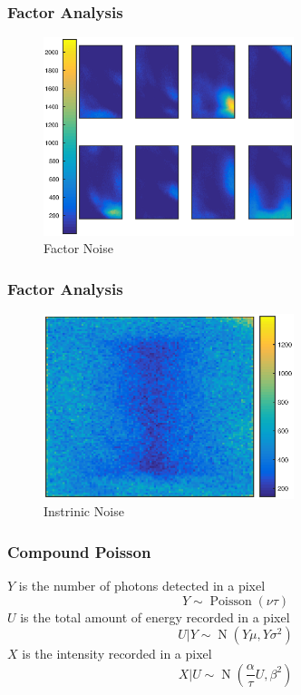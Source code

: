 \documentclass{beamer}
\DeclareMathOperator{\normal}{N}
\DeclareMathOperator{\poisson}{Poisson}
\begin{document}
\begin{frame}
\frametitle{Factor Analysis}
\begin{figure}
	\includegraphics[width = 0.65\textwidth]{figures/initial_factor_factorNoise.eps}
	\caption{Factor Noise}
\end{figure}
\end{frame}

\begin{frame}
\frametitle{Factor Analysis}
\begin{figure}
	\includegraphics[width = 0.65\textwidth]{figures/initial_factor_instrinicNoise.eps}
	\caption{Instrinic Noise}
\end{figure}
\end{frame}

\begin{frame}
\frametitle{Compound Poisson}
$Y$ is the number of photons detected in a pixel
\begin{equation}
Y\sim\poisson(\nu \tau)
\end{equation}
$U$ is the total amount of energy recorded in a pixel
\begin{equation}
U|Y\sim\normal\left(
Y\mu,Y\sigma^2
\right)
\end{equation}
$X$ is the intensity recorded in a pixel
\begin{equation}
X|U\sim\normal\left(
\frac{\alpha}{\tau}U,\beta^2
\right)
\end{equation}
\end{frame}
\end{document}
